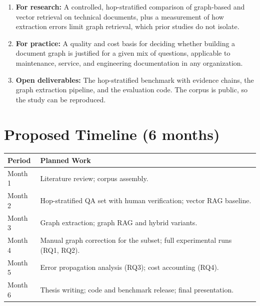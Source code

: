 \documentclass[10pt,a4paper]{article}
\begin{document}
\begin{enumerate}
    \item \textbf{For research:} A controlled, hop-stratified comparison of graph-based and vector retrieval on technical documents, plus a measurement of how extraction errors limit graph retrieval, which prior studies do not isolate.
    \item \textbf{For practice:} A quality and cost basis for deciding whether building a document graph is justified for a given mix of questions, applicable to maintenance, service, and engineering documentation in any organization.
    \item \textbf{Open deliverables:} The hop-stratified benchmark with evidence chains, the graph extraction pipeline, and the evaluation code. The corpus is public, so the study can be reproduced.
\end{enumerate}

\section{Proposed Timeline (6 months)}

\begin{tabularx}{\textwidth}{|p{2.6cm}|X|}
\hline
\rowcolor{lightgray}
\textbf{Period} & \textbf{Planned Work} \\
\hline
Month 1 & Literature review; corpus assembly. \\
\hline
Month 2 & Hop-stratified QA set with human verification; vector RAG baseline. \\
\hline
Month 3 & Graph extraction; graph RAG and hybrid variants. \\
\hline
Month 4 & Manual graph correction for the subset; full experimental runs (RQ1, RQ2). \\
\hline
Month 5 & Error propagation analysis (RQ3); cost accounting (RQ4). \\
\hline
Month 6 & Thesis writing; code and benchmark release; final presentation. \\
\hline
\end{tabularx}
\end{document}
